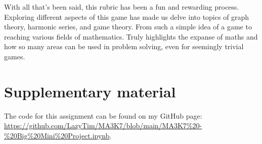 \documentclass[11pt]{article}
\newcommand{\keywordfont}{\textsc}
\newcommand{\keyword}[1]{%
  \marginpar{\raggedright\small\keywordfont{#1}}}
\begin{document}
With \keyword{Reflect} all that's been said, this rubric has been a fun and rewarding process. Exploring different aspects of this game has made us delve into topics of graph theory, harmonic series, and game theory. From such a simple idea of a game to reaching various fields of mathematics. Truly highlights the expanse of maths and how so many areas can be used in problem solving, even for seemingly trivial games. 

\section*{Supplementary material}
The code for this assignment can be found on my GitHub page:  \url{https://github.com/LazyTim/MA3K7/blob/main/MA3K7%20-%20Big%20Mini%20Project.ipynb}.
\end{document}
